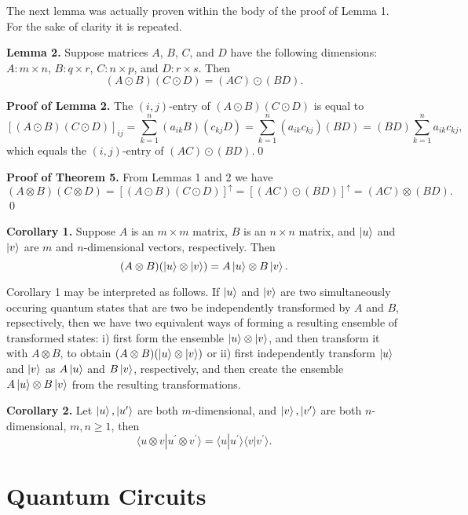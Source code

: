 \documentclass [12pt]{article}
\theoremstyle{definition}
\begin{document}
The next lemma was actually proven within the body of the proof of Lemma 1. For the sake of clarity it is repeated.

\textbf{Lemma 2.} Suppose matrices $A$, $B$, $C$, and $D$ have the following dimensions: $A:m\times n$, $B:q\times r$, $C:n\times p$, and $D:r\times s$. 
Then 
\[(A\odot B)(C\odot D) = (AC)\odot (BD).\]

\textbf{Proof of Lemma 2.} The $(i,j)$-entry of $(A\odot B)(C\odot D)$ is equal to 
\[[(A\odot B)(C\odot D)]_{ij} = \sum_{k=1}^n (a_{ik}B)(c_{kj}D) = \sum_{k=1}^n(a_{ik}c_{kj})(BD) = (BD)\sum_{k=1}^na_{ik}c_{kj},\]
which equals the $(i,j)$-entry of $(AC)\odot (BD)$.\qed




\textbf{Proof of Theorem 5.} From Lemmas 1 and 2 we have
\[(A\otimes B)(C\otimes D) = [(A\odot B)(C\odot D)]^{\uparrow} = [(AC)\odot(BD)]^{\uparrow} = (AC)\otimes (BD).\]
\qed



\newpage
\textbf{Corollary 1.} Suppose $A$ is an $m\times m$ matrix, $B$ is an $n\times n$ matrix, and $\ket{u}$ and $\ket{v}$ are $m$ and $n$-dimensional vectors, respectively.
Then 
\[(A\otimes B)(\ket{u}\otimes \ket{v}) = A\ket{u}\otimes B\ket{v}.\]

Corollary 1 may be interpreted as follows. If $\ket{u}$ and $\ket{v}$ are two simultaneously occuring quantum states that are two be independently transformed by 
$A$ and $B$, repsectively, then we have two equivalent ways of forming a resulting ensemble of transformed states: i) first form the ensemble $\ket{u}\otimes \ket{v}$, and then transform
it with $A\otimes B$, to obtain $(A\otimes B)(\ket{u}\otimes \ket{v})$  or ii) first independently transform $\ket{u}$ and $\ket{v}$ as $A\ket{u}$ and $B\ket{v}$, respectively,
and then create the ensemble
$A\ket{u}\otimes B\ket{v}$ from the resulting transformations.

\textbf{Corollary 2.} Let $\ket{u},\ket{u^{\prime}}$ are both $m$-dimensional, and $\ket{v},\ket{v^{\prime}}$ are both $n$-dimensional, $m,n\geq 1$, then
\[\langle u\otimes v | u^{\prime} \otimes v^{\prime}\rangle = \langle u|u^{\prime}\rangle\langle v|v^{\prime}\rangle.\]










\newpage
\section*{Quantum Circuits}
\end{document}
